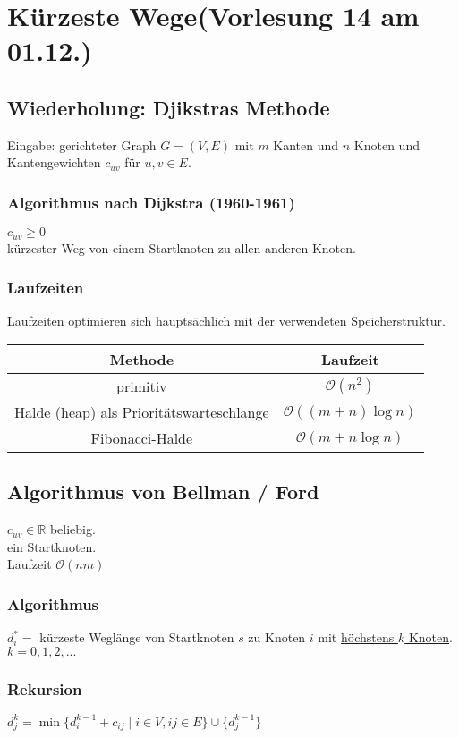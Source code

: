 \section{Kürzeste Wege\tiny (Vorlesung 14 am 01.12.)}

\subsection{Wiederholung: Djikstras Methode}
Eingabe: gerichteter Graph $G=(V,E)$ mit $m$ Kanten und $n$ Knoten und Kantengewichten $c_{uv}$ für $u,v \in E$.
\subsubsection{Algorithmus nach Dijkstra (1960-1961)}
$c_{uv} \geq 0$\\
kürzester Weg von einem Startknoten zu allen anderen Knoten.\\
\subsubsection*{Laufzeiten}
Laufzeiten optimieren sich hauptsächlich mit der verwendeten Speicherstruktur.\\
\begin{tabular}{|c|c|}
\hline
\textbf{Methode} & \textbf{Laufzeit}\\
\hline
\hline
primitiv & $\mathcal{O}(n^2)$\\
\hline
Halde (heap) als Prioritätswarteschlange & $\mathcal{O}((m+n)\log	 n)$\\
\hline
Fibonacci-Halde & $\mathcal{O}(m + n \log n)$\\
\hline
\end{tabular}
\subsection{Algorithmus von Bellman / Ford}
$c_{uv} \in \mathbb{R}$ beliebig.\\
ein Startknoten.\\
Laufzeit $\mathcal{O}(nm)$\\
\subsubsection*{Algorithmus}
$d_i^* = $ kürzeste Weglänge von Startknoten $s$ zu Knoten $i$ mit \underline{höchstens $k$ Knoten}.\\
$k=0,1,2,...$\\
\subsubsection{Rekursion}
$d_j^k= \min	\{ d_i^{k-1} + c_{ij} \; | \; i \in V, ij \in E\} \cup \{d_j^{k-1}\}$\\
